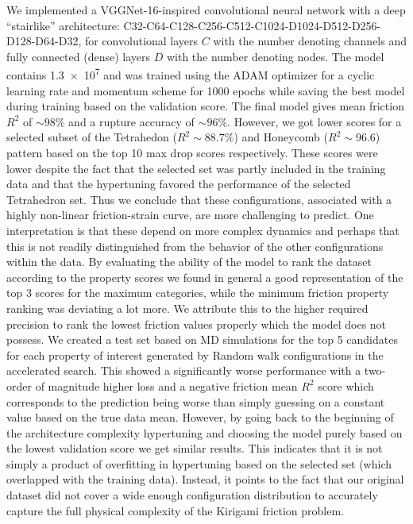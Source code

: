 We implemented a VGGNet-16-inspired convolutional neural network with a deep
``stairlike'' architecture:
C32-C64-C128-C256-C512-C1024-D1024-D512-D256-D128-D64-D32, for convolutional
layers $C$ with the number denoting channels and fully connected (dense) layers
$D$ with the number denoting nodes. The model contains \num{1.3e7} and was
trained using the ADAM optimizer for a cyclic learning rate and momentum scheme
for 1000 epochs while saving the best model during training based on the
validation score. The final model gives mean friction $R^2$ of $\sim 98\%$ and a
rupture accuracy of $\sim 96 \%$. However, we got lower scores for a selected
subset of the Tetrahedon ($R^2 \sim 88.7 \%$) and Honeycomb ($R^2 \sim 96.6$)
pattern based on the top 10 max drop scores respectively. These scores were
lower despite the fact that the selected set was partly included in the training
data and that the hypertuning favored the performance of the selected
Tetrahedron set. Thus we conclude that these configurations, associated with a
highly non-linear friction-strain curve, are more challenging to predict. One
interpretation is that these depend on more complex dynamics and perhaps that
this is not readily distinguished from the behavior of the other configurations
within the data. By evaluating the ability of the model to rank the dataset
according to the property scores we found in general a good representation of
the top 3 scores for the maximum categories, while the minimum friction property
ranking was deviating a lot more. We attribute this to the higher required
precision to rank the lowest friction values properly which the model does not
possess. We created a test set based on \acrshort{MD} simulations for the top 5 candidates for each property of interest generated by Random walk configurations in the accelerated search. This showed a significantly worse performance with a two-order of magnitude higher loss and a negative friction mean $R^2$ score which corresponds to the prediction being worse than simply guessing on a constant value based on the true data mean. However, by going back to the beginning of the architecture complexity hypertuning and choosing the model purely based on the lowest validation score we get similar results. This indicates that it is not simply a product of overfitting in hypertuning based on the selected set (which overlapped with the training data). Instead, it points to the fact that our original dataset did not cover a wide enough configuration distribution to accurately capture the full physical complexity of the Kirigami friction problem. 

